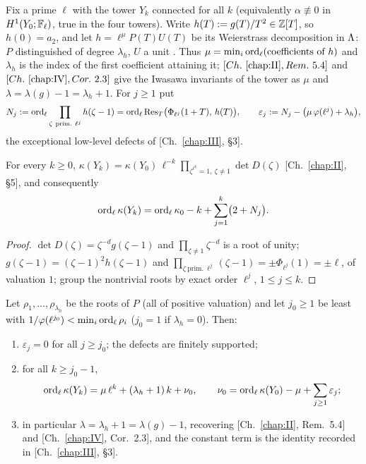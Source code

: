 Fix a prime $\ell$ with the tower $Y_k$ connected for all $k$ (equivalently
$\alpha\not\equiv0$ in $H^{1}(Y_0;\mathbb{F}_\ell)$, true in the four towers). Write
$h(T):=g(T)/T^{2}\in\mathbb{Z}[T]$, so $h(0)=a_2$, and let $h=\ell^{\mu}P(T)U(T)$ be its
Weierstrass decomposition in $\Lambda$: $P$ distinguished of degree $\lambda_h$, $U$ a unit
\cite{Wa}. Thus $\mu=\min_i\operatorname{ord}_\ell(\text{coefficients of }h)$ and $\lambda_h$ is the
index of the first coefficient attaining it; $[Ch.~\ref{chap:II}, Rem.~5.4]$ and $[Ch.~\ref{chap:IV}, Cor.~2.3]$ give
the Iwasawa invariants of the tower as $\mu$ and $\lambda=\lambda(g)-1=\lambda_h+1$.
For $j\ge1$ put
\[
N_j:=\ord_\ell\prod_{\zeta\ \mathrm{prim.}\ \ell^{j}}h(\zeta-1)
=\ord_\ell\Res_T\bigl(\Phi_{\ell^{j}}(1+T),\,h(T)\bigr),
\qquad
\varepsilon_j:=N_j-\bigl(\mu\,\varphi(\ell^{j})+\lambda_h\bigr),
\]
the exceptional low-level defects of [Ch.~\ref{chap:III}, \S3].

\begin{lemma}\label{IX:lem:char}
For every $k\ge0$,
$\kappa(Y_k)=\kappa(Y_0)\,\ell^{-k}\prod_{\zeta^{\ell^{k}}=1,\ \zeta\neq1}\det D(\zeta)$
{\rm[Ch.~\ref{chap:II}, \S5]}, and consequently
\[
\operatorname{ord}_\ell\kappa(Y_k)=\operatorname{ord}_\ell\kappa_0-k+\sum_{j=1}^{k}\bigl(2+N_j\bigr).
\]
\end{lemma}

\begin{proof}
$\det D(\zeta)=\zeta^{-d}g(\zeta-1)$ and $\prod_{\zeta\neq1}\zeta^{-d}$ is a root of
unity; $g(\zeta-1)=(\zeta-1)^{2}h(\zeta-1)$ and
$\prod_{\zeta\ \mathrm{prim.}\ \ell^{j}}(\zeta-1)=\pm\Phi_{\ell^{j}}(1)=\pm\ell$, of
valuation $1$; group the nontrivial roots by exact order $\ell^{j}$, $1\le j\le k$.
\end{proof}

\begin{theorem}\label{IX:thm:book}
Let $\rho_1,\dots,\rho_{\lambda_h}$ be the roots of $P$ (all of positive valuation) and
let $j_0\ge1$ be least with $1/\varphi(\ell^{j_0})<\min_i\operatorname{ord}_\ell\rho_i$ ($j_0=1$ if
$\lambda_h=0$). Then:
\begin{enumerate}
\item[(i)] $\varepsilon_j=0$ for all $j\ge j_0$; the defects are finitely supported;
\item[(ii)] for all $k\ge j_0-1$,
\[
\operatorname{ord}_\ell\kappa(Y_k)=\mu\,\ell^{k}+(\lambda_h+1)\,k+\nu_0,\qquad
\nu_0=\operatorname{ord}_\ell\kappa(Y_0)-\mu+\sum_{j\ge1}\varepsilon_j ;
\]
\item[(iii)] in particular $\lambda=\lambda_h+1=\lambda(g)-1$, recovering
{\rm[Ch.~\ref{chap:II}, Rem.~5.4]} and {\rm[Ch.~\ref{chap:IV}, Cor.~2.3]}, and the constant term is the identity
recorded in {\rm[Ch.~\ref{chap:III}, \S3]}.
\end{enumerate}
\end{theorem}

